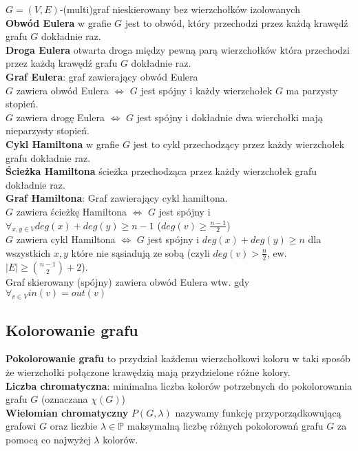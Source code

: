 \documentclass[a4paper,12pt]{article}
\begin{document}
$G=(V,E)$-(multi)graf nieskierowany bez wierzchołków izolowanych\\
\textbf{Obwód Eulera} w grafie $G$ jest to obwód, który przechodzi przez każdą krawędź grafu $G$ dokładnie raz.\\
\textbf{Droga Eulera} otwarta droga między pewną parą wierzchołków która przechodzi przez każdą krawędź grafu $G$ dokładnie raz.\\
\textbf{Graf Eulera}: graf zawierający obwód Eulera\\
$G$ zawiera obwód Eulera $\Leftrightarrow$ $G$ jest spójny i każdy wierzchołek $G$ ma parzysty stopień. \\
$G$ zawiera drogę Eulera $\Leftrightarrow$ $G$ jest spójny i dokładnie dwa wierchołki mają nieparzysty stopień. \\
\textbf{Cykl Hamiltona} w grafie $G$ jest to cykl przechodzący przez każdy wierzchołek grafu dokładnie raz.\\
\textbf{Ścieżka Hamiltona} ścieżka przechodząca przez każdy wierzchołek grafu dokładnie raz.\\
\textbf{Graf Hamiltona}: Graf zawierający cykl hamiltona.\\
$G$ zawiera ścieżkę Hamiltona $\Leftrightarrow$ $G$ jest spójny i $\forall_{x,y\in V} deg(x)+deg(y)\geq n-1$ ($deg(v)\geq \frac{n-1}{2}$)\\
$G$ zawiera cykl Hamiltona $\Leftrightarrow$ $G$ jest spójny i $deg(x)+deg(y)\geq n$ dla wszystkich $x, y$ które nie sąsiadują ze sobą (czyli $deg(v)>\frac{n}{2}$, ew. $|E|\geq {{n-1}\choose{2}}+2$).\\
Graf skierowany (spójny) zawiera obwód Eulera wtw. gdy $\forall_{v\in V} in(v)=out(v)$
\subsection{Kolorowanie grafu}
\textbf{Pokolorowanie grafu} to przydział każdemu wierzchołkowi koloru w taki sposób że wierzchołki połączone krawędzią mają przydzielone różne kolory.\\
\textbf{Liczba chromatyczna}: minimalna liczba kolorów potrzebnych do pokolorowania grafu $G$ (oznaczana $\chi(G)$)\\
\textbf{Wielomian chromatyczny} $P(G,\lambda)$ nazywamy funkcję przyporządkowującą grafowi $G$ oraz liczbie $\lambda\in\mathbb{P}$ maksymalną liczbę różnych pokolorowań grafu $G$ za pomocą co najwyżej $\lambda$ kolorów.
\end{document}
